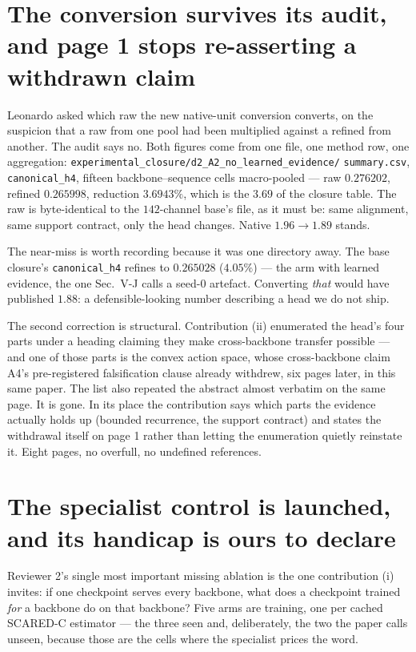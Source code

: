 \documentclass[11pt,a4paper]{article}
\begin{document}
\section*{The conversion survives its audit, and page 1 stops re-asserting a withdrawn claim}

Leonardo asked which raw the new native-unit conversion converts, on the
suspicion that a raw from one pool had been multiplied against a refined from
another. The audit says no. Both figures come from one file, one method row,
one aggregation: \texttt{experimental\_closure/d2\_A2\_no\_learned\_evidence/}
\texttt{summary.csv}, \texttt{canonical\_h4}, fifteen backbone--sequence cells
macro-pooled --- raw $0.276202$, refined $0.265998$, reduction $3.6943\%$,
which is the $3.69$ of the closure table. The raw is byte-identical to the
$142$-channel base's file, as it must be: same alignment, same support
contract, only the head changes. Native $1.96 \to 1.89$ stands.

The near-miss is worth recording because it was one directory away. The base
closure's \texttt{canonical\_h4} refines to $0.265028$ ($4.05\%$) --- the arm
with learned evidence, the one Sec.~V-J calls a seed-$0$ artefact. Converting
\emph{that} would have published $1.88$: a defensible-looking number
describing a head we do not ship.

The second correction is structural. Contribution (ii) enumerated the head's
four parts under a heading claiming they make cross-backbone transfer
possible --- and one of those parts is the convex action space, whose
cross-backbone claim A4's pre-registered falsification clause already
withdrew, six pages later, in this same paper. The list also repeated the
abstract almost verbatim on the same page. It is gone. In its place the
contribution says which parts the evidence actually holds up (bounded
recurrence, the support contract) and states the withdrawal itself on page 1
rather than letting the enumeration quietly reinstate it. Eight pages, no
overfull, no undefined references.



\section*{The specialist control is launched, and its handicap is ours to declare}

Reviewer 2's single most important missing ablation is the one contribution
(i) invites: if one checkpoint serves every backbone, what does a checkpoint
trained \emph{for} a backbone do on that backbone? Five arms are training,
one per cached SCARED-C estimator --- the three seen and, deliberately, the
two the paper calls unseen, because those are the cells where the specialist
prices the word.
\end{document}
